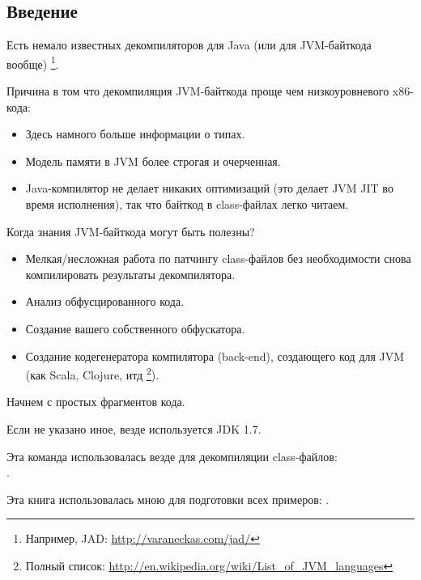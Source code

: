\subsection{Введение}

\newcommand{\JADURL}{\url{http://varaneckas.com/jad/}}

Есть немало известных декомпиляторов для Java (или для \ac{JVM}-байткода вообще)
\footnote{Например, JAD: \JADURL}.

Причина в том что декомпиляция \ac{JVM}-байткода проще чем низкоуровневого x86-кода:

\begin{itemize}
\item Здесь намного больше информации о типах.
      
\item Модель памяти в \ac{JVM} более строгая и очерченная.
\item Java-компилятор не делает никаких оптимизаций (это делает \ac{JVM} \ac{JIT} во время 
       исполнения), так что байткод в class-файлах легко читаем.
\end{itemize}

Когда знания \ac{JVM}-байткода могут быть полезны?

\newcommand{\URLListOfJVMLangs}{\url{http://en.wikipedia.org/wiki/List_of_JVM_languages}}

\begin{itemize}
\item Мелкая/несложная работа по патчингу class-файлов без необходимости снова компилировать результаты 
      декомпилятора.
\item Анализ обфусцированного кода.
\item Создание вашего собственного обфускатора.
\item Создание кодегенератора компилятора (back-end), создающего код для \ac{JVM} (как Scala, Clojure, итд
      \footnote{Полный список: \URLListOfJVMLangs}).
\end{itemize}

Начнем с простых фрагментов кода.

Если не указано иное, везде используется JDK 1.7.

Эта команда использовалась везде для декомпиляции class-файлов:\\
.

Эта книга использовалась мною для подготовки всех примеров: \JavaBook.

